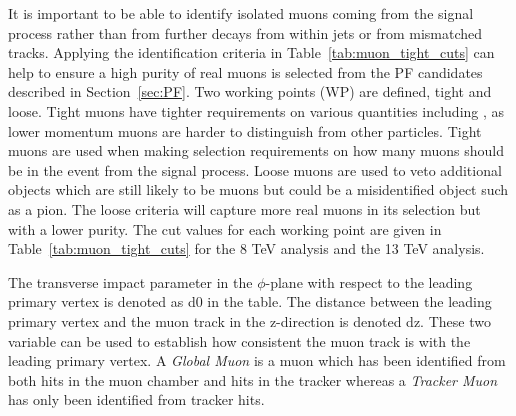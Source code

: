 It is important to be able to identify isolated muons coming from the signal process rather than from further decays from within jets or from mismatched tracks. Applying the identification criteria in Table~\ref{tab:muon_tight_cuts} can help to ensure a high purity of real muons is selected from the PF candidates described in Section~\ref{sec:PF}. Two working points (WP) are defined, tight and loose. Tight muons have tighter requirements on various quantities including \pt, as lower momentum muons are harder to distinguish from other particles. Tight muons are used when making selection requirements on how many muons should be in the event from the signal process. Loose muons are used to veto additional objects which are still likely to be muons but could be a misidentified object such as a pion. The loose criteria will capture more real muons in its selection but with a lower purity.
The cut values for each working point are given in Table~\ref{tab:muon_tight_cuts} for the 8 TeV analysis and the 13 TeV analysis.

The transverse impact parameter in the $\phi$-plane with respect to the leading primary vertex is denoted as d0 in the table. The distance between the leading primary vertex and the muon track in the z-direction is denoted dz. These two variable can be used to establish how consistent the muon track is with the leading primary vertex.
A \emph{Global Muon} is a muon which has been identified from both hits in the muon chamber and hits in the tracker whereas a \emph{Tracker Muon} has only been identified from tracker hits.


